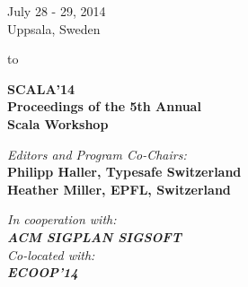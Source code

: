 \documentclass[10pt]{book}
\title{}
\date{}
\newcommand{\HRule}[1]{\hfill \rule{0.3\linewidth}{#1}} %
\begin{document}
\thispagestyle{empty}


{\centering \large \sffamily
\hfill July 28 - 29, 2014 \\
\hfill Uppsala, Sweden}




\hbox to\hsize{\null}


\vfill


{\sffamily
\Huge \noindent \textbf{SCALA'14} \\[1ex]
\LARGE \textbf{Proceedings of the 5th Annual} \\[.5ex]
\huge \textbf{Scala Workshop}}

\vfill

\vfill\vfill



{\sffamily
\large \noindent \textit{Editors and Program Co-Chairs:} \\[.3ex]
\Large \textbf{Philipp Haller, Typesafe Switzerland} \\[.3ex]
\Large \textbf{Heather Miller, EPFL, Switzerland}
}


\vfill\vfill \vfill


{\sffamily
\noindent
\normalsize \textit{In cooperation with:} \\[.3ex]
\Large \textbf{\textit{ACM SIGPLAN SIGSOFT}} \\[1ex]
\normalsize \textit{Co-located with:} \\[.3ex]
\Large \textbf{\textit{ECOOP'14}}
}


\vfill\vfill


\end{document}
